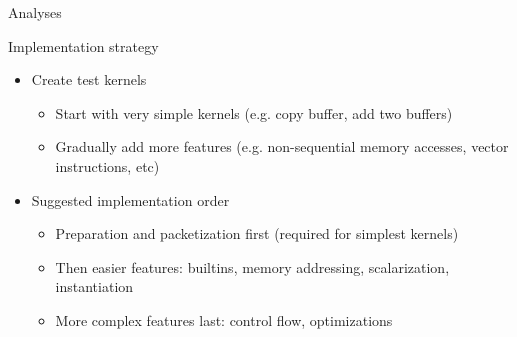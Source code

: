 
\begin{frame}{Analyses}


\end{frame}


\begin{frame}{Implementation strategy}

\begin{itemize}
    \item Create test kernels
    \begin{itemize}
        \item Start with very simple kernels (e.g. copy buffer, add two buffers)
        \item Gradually add more features (e.g. non-sequential memory accesses, vector instructions, etc)
    \end{itemize}
    
    \item Suggested implementation order
    \begin{itemize}
        \item Preparation and packetization first (required for simplest kernels)
        \item Then easier features: builtins, memory addressing, scalarization, instantiation
        \item More complex features last: control flow, optimizations
    \end{itemize}
\end{itemize}

\end{frame}



